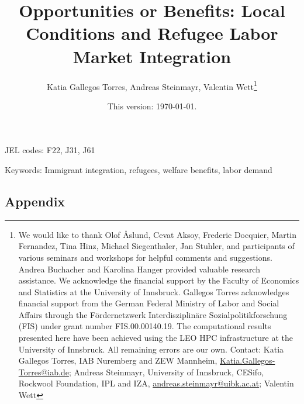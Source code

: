 \documentclass[a4paper, 11pt, abstracton]{extarticle}
\title{\centering Opportunities or Benefits: Local Conditions and Refugee Labor Market Integration}
\author{Katia Gallegos Torres, Andreas Steinmayr, Valentin Wett\thanks{We would like to thank  Olof Åslund, Cevat Aksoy, Frederic Docquier, Martin Fernandez, Tina Hinz, Michael Siegenthaler, Jan Stuhler, and participants of various seminars and workshops for helpful comments and suggestions. Andrea Buchacher and Karolina Hanger provided valuable research assistance. We acknowledge the financial support by the Faculty of Economics and Statistics at the University of Innsbruck. Gallegos Torres acknowledges financial support from the German Federal Ministry of Labor and Social Affairs through the Fördernetzwerk Interdisziplinäre Sozialpolitikforschung (FIS) under grant number FIS.00.00140.19. The computational results presented here have been achieved using the LEO HPC infrastructure at the University of Innsbruck. All remaining errors are our own.
\newline Contact: Katia Gallegos Torres, IAB Nuremberg and ZEW Mannheim, \href{mailto:Katia.Gallegos-Torres@iab.de}{Katia.Gallegos-Torres@iab.de}; Andreas Steinmayr, University of Innsbruck, CESifo, Rockwool Foundation, IPL and IZA, \href{mailto:andreas.steinmayr@uibk.ac.at}{andreas.steinmayr@uibk.ac.at}; Valentin Wett}}
\date{This version: \today.}
\begin{document}

\maketitle

\thispagestyle{empty} 
  
\begin{abstract} 

\end{abstract}

\vspace{1em}

JEL codes: F22, J31, J61 

Keywords: Immigrant integration, refugees, welfare benefits, labor demand

\newpage
\setcounter{page}{1}





\FloatBarrier

\FloatBarrier

\FloatBarrier

\FloatBarrier

\FloatBarrier

\FloatBarrier

\FloatBarrier

\FloatBarrier

%


\newpage


{}

\newpage
\begin{appendix}
    \part*{Appendix}
    \setcounter{page}{1} 
    \setcounter{footnote}{0}
    
    \renewcommand\theequation{\Alph{section}.\arabic{equation}}
    \setcounter{figure}{0}  \renewcommand{\thefigure}{\Alph{section}.\arabic{figure}} 
    \setcounter{table}{0} \renewcommand{\thetable}{\Alph{section}.\arabic{table}}

    
    
    \FloatBarrier
    \FloatBarrier

    \end{appendix}
\end{document}
